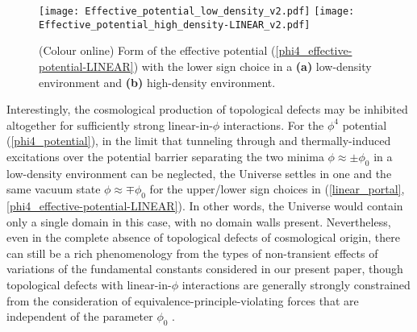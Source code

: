 \documentclass[aps,prd,onecolumn,nofootinbib]{revtex4-2} %
\begin{document}
\begin{figure*}[t!]
\centering
\texttt{[image: Effective\_potential\_low\_density\_v2.pdf]}
\hspace{5mm}
\texttt{[image: Effective\_potential\_high\_density-LINEAR\_v2.pdf]}
\caption{ \normalsize (Colour online) 
Form of the effective potential (\ref{phi4_effective-potential-LINEAR}) with the lower sign choice in a \textbf{(a)} low-density environment and \textbf{(b)} high-density environment. 
}
\label{Fig:Effective_potentials-LINEAR}
\end{figure*}




Interestingly, the cosmological production of topological defects may be inhibited altogether for sufficiently strong linear-in-$\phi$ interactions. 
For the $\phi^4$ potential (\ref{phi4_potential}), in the limit that tunneling through and thermally-induced excitations over the potential barrier separating the two minima $\phi \approx \pm \phi_0$ in a low-density environment can be neglected, the Universe settles in one and the same vacuum state $\phi \approx \mp \phi_0$ for the upper/lower sign choices in (\ref{linear_portal},\ref{phi4_effective-potential-LINEAR}). 
In other words, the Universe would contain only a single domain in this case, with no domain walls present. 
Nevertheless, even in the complete absence of topological defects of cosmological origin, there can still be a rich phenomenology from the types of non-transient effects of variations of the fundamental constants considered in our present paper, though topological defects with linear-in-$\phi$ interactions are generally strongly constrained from the consideration of equivalence-principle-violating forces that are independent of the parameter $\phi_0$ \cite{Varying_alpha_string_2005,Varying_alpha_monopole_2005,Varying_alpha_wall_2011}. 
\end{document}
